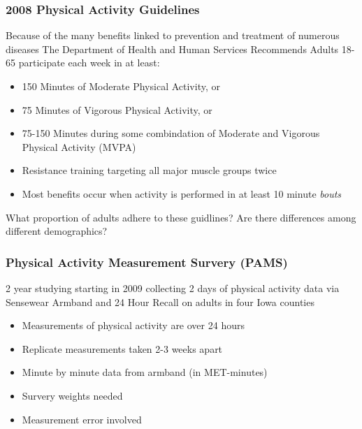 \documentclass[handout]{beamer}\usepackage[]{graphicx}\usepackage[]{color}
\begin{document}
\begin{frame}
\frametitle{2008 Physical Activity Guidelines}
Because of the many benefits linked to prevention and treatment of numerous diseases The Department of Health and Human Services Recommends Adults 18-65 participate each week in at least: %



\begin{itemize}
\item
150 Minutes of Moderate Physical Activity, or
\item
75 Minutes of Vigorous Physical Activity, or
\item
75-150 Minutes during some combindation of Moderate and Vigorous Physical Activity (MVPA)
\item
Resistance training targeting all major muscle groups twice
\item
Most benefits occur when activity is performed in at least 10 minute \emph{bouts}
\end{itemize}

\vspace{0.3cm}

What proportion of adults adhere to these guidlines? Are there differences among different demographics?

\end{frame}


\begin{frame}
\frametitle{Physical Activity Measurement Survery (PAMS)}
2 year studying starting in 2009 collecting 2 days of physical activity data via Sensewear Armband and 24 Hour Recall on adults in four Iowa counties

\begin{itemize}
\item
Measurements of physical activity are over 24 hours
\item
Replicate measurements taken 2-3 weeks apart
\item
Minute by minute data from armband (in MET-minutes)
\item
Survery weights needed 
\item
Measurement error involved
\end{itemize}

\end{frame}
\end{document}
